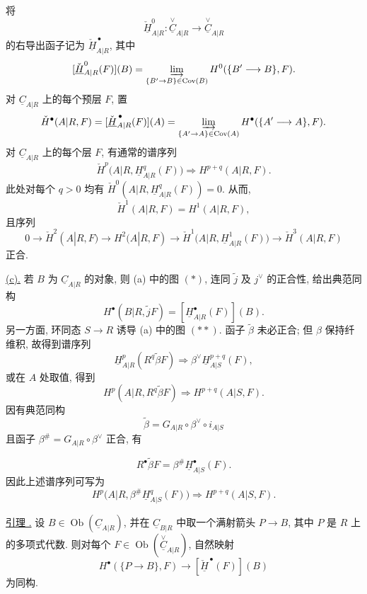 将
\[
 \check{\underline H}^{0}_{A|R}:
 \overset{\vee}{\underline C}_{A|R}
 \longrightarrow\overset{\vee}{\underline C}_{A|R}
\]
的右导出函子记为 $\check{\underline H}^{\,\bullet}_{A|R}$, 其中
\[
 [\check{\underline H}^{0}_{A|R}(F)](B)=
 \varinjlim_{\{B'\to B\}\in\operatorname{Cov}(B)}
 H^0(\{B'\longrightarrow B\},F).
\]
对 $\underline C_{A|R}$ 上的每个预层 $F$, 置
\[
 \check H^{\bullet}(A|R,F)=
 [\check{\underline H}^{\,\bullet}_{A|R}(F)](A)=
 \varinjlim_{\{A'\to A\}\in\operatorname{Cov}(A)}
 H^{\bullet}(\{A'\longrightarrow A\},F).
\]
对 $\underline C_{A|R}$ 上的每个层 $F$, 有通常的谱序列
\[
 \check H^p\bigl(A|R,\underline H^q_{A|R}(F)\bigr)
 \Longrightarrow H^{p+q}(A|R,F).
\]
此处对每个 $q>0$ 均有 $\check H^0(A|R,\underline H^q_{A|R}(F))=0$.
从而,
\[
 \check H^1(A|R,F)=H^1(A|R,F),
\]
且序列
\[
 0\longrightarrow\check H^2(A|R,F)
 \longrightarrow H^2(A|R,F)
 \longrightarrow
 \check H^1\bigl(A|R,\underline H^1_{A|R}(F)\bigr)
 \longrightarrow\check H^3(A|R,F)
\]
正合.


\underline{(c).}
若 $B$ 为 $\underline C_{A|R}$ 的对象,
则 (a) 中的图 $(*)$,
连同 $\widetilde j$ 及 $j^{\vee}$ 的正合性, 给出典范同构
\[
 H^{\bullet}(B|R,\widetilde jF)=
 [\underline H^{\bullet}_{A|R}(F)](B).
\]
另一方面, 环同态 $S\longrightarrow R$ 诱导
(a) 中的图 $(**)$.
函子 $\widetilde\beta$ 未必正合; 但 $\beta$ 保持纤维积, 故得到谱序列
\[
 \underline H^p_{A|R}(R^q\widetilde\beta F)
 \Longrightarrow
 \beta^{\vee}\underline H^{p+q}_{A|S}(F),
\]
或在 $A$ 处取值, 得到
\[
 H^p(A|R,R^q\widetilde\beta F)
 \Longrightarrow H^{p+q}(A|S,F).
\]
因有典范同构
\[
 \widetilde\beta=
 G_{A|R}\circ\beta^{\vee}\circ i_{A|S}
\]
且函子 $\beta^{\#}=G_{A|R}\circ\beta^{\vee}$ 正合, 有


\[
 R^{\bullet}\widetilde\beta F=
 \beta^{\#}\underline H^{\bullet}_{A|S}(F).
\]
因此上述谱序列可写为
\[
 H^p\bigl(A|R,\beta^{\#}\underline H^q_{A|S}(F)\bigr)
 \Longrightarrow H^{p+q}(A|S,F).
\]

\underline{引理 .}
设 $B\in\operatorname{Ob}(\underline C_{A|R})$,
并在 $\underline C_{B|R}$ 中取一个满射箭头 $P\longrightarrow B$,
其中 $P$ 是 $R$ 上的多项式代数.
则对每个 $F\in\operatorname{Ob}(\overset{\vee}{\underline C}_{A|R})$, 自然映射
\[
 H^{\bullet}(\{P\longrightarrow B\},F)
 \longrightarrow[\check{\underline H}^{\,\bullet}(F)](B)
\]
为同构.


